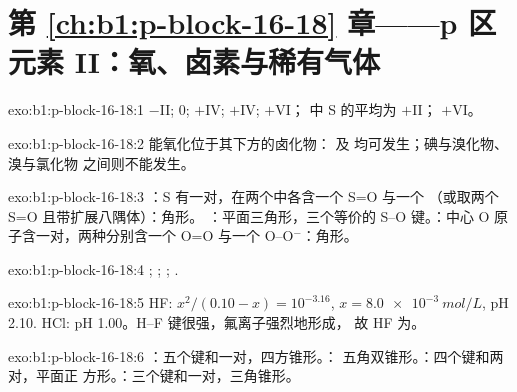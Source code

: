 \section*{第 \ref{ch:b1:p-block-16-18} 章——p 区元素 II：氧、卤素与稀有气体}

\begin{solution}{exo:b1:p-block-16-18:1}
 $-$II;  0;  $+$IV;  $+$IV; 
$+$VI； 中 S 的平均为 $+$II； $+$VI。
\end{solution}

\begin{solution}{exo:b1:p-block-16-18:2}
能氧化位于其下方的卤化物： 及
 均可发生；碘与溴化物、溴与氯化物
之间则不能发生。
\end{solution}

\begin{solution}{exo:b1:p-block-16-18:3}
：S 有一对，在两个中各含一个 S=O 与一个 
（或取两个 S=O 且带扩展八隅体）：角形。
：平面三角形，三个等价的 S--O 键。：中心 O
原子含一对，两种分别含一个 O=O 与一个 O--O$^-$：角形。
\end{solution}

\begin{solution}{exo:b1:p-block-16-18:4}
; ;
; .
\end{solution}

\begin{solution}{exo:b1:p-block-16-18:5}
HF: $x^2/(0.10 - x) = 10^{-3.16}$, $x = \qty{8.0e-3}{mol/L}$, pH 2.10. HCl:
pH 1.00。H--F 键很强，氟离子强烈地形成，
故 HF 为。
\end{solution}

\begin{solution}{exo:b1:p-block-16-18:6}
：五个键和一对，四方锥形。：
五角双锥形。：四个键和两对，平面正
方形。：三个键和一对，三角锥形。
\end{solution}

